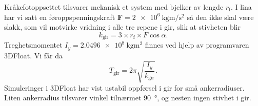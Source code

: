 Kråkefotoppsettet tilsvarer mekanisk et system med bjelker av lengde $r_{\mathrm{f}}$.
I lina har vi satt en føroppspenningskraft $\bm{F} = \SI{2e6}{\kilo\gram\meter\per\second\squared}$ så den ikke skal være slakk, som vil motvirke vridning i alle tre repene i gir, slik at stivheten blir
\[
k_{\mathrm{gir}} = 3\times r_{\mathrm{f}} \times F\cos{\alpha}.
\]
Treghetsmomentet $I_y = \SI{2.0496e8}{\kilo\gram\meter\squared}$ finnes ved hjelp av  programvaren 3DFloat.
Vi får da
\[
T_{\mathrm{gir}} = 2\pi\sqrt{\frac{I_y}{k_{\mathrm{gir}}}}.
\]
Simuleringer i 3DFloat har vist ustabil oppførsel i gir for små ankerradiuser.
Liten ankerradius tilsvarer vinkel tilnærmet \SI{90}{\degree}, og nesten ingen stivhet i gir.
